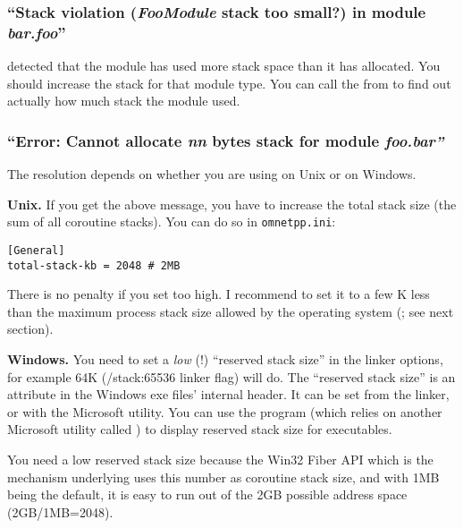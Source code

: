 \subsubsection{``Stack violation (\textit{FooModule} stack too small?) in module \textit{bar.foo}''}

{\opp} detected that the module has used more stack space than it has
allocated. You should increase the stack for that module type. You can call
the  from  to find out actually
how much stack the module used.


\subsubsection{``Error: Cannot allocate \textit{nn} bytes stack for module \textit{foo.bar''}}

The resolution depends on whether you are using {\opp} on Unix or on Windows.

\textbf{Unix.}
If you get the above message, you have to increase the total stack
size (the sum of all coroutine stacks). You can do
so in \texttt{omnetpp.ini}:

\begin{verbatim}
[General]
total-stack-kb = 2048 # 2MB
\end{verbatim}

There is no penalty if you set  too high. I
recommend to set it to a few K less than the maximum process stack
size allowed by the operating system (; see
next section).


\textbf{Windows.}
You need to set a \textit{low} (!) ``reserved stack size''
in the linker options, for example 64K (/stack:65536 linker flag) will do.
The ``reserved stack size'' is an attribute in the Windows exe
files' internal header. It can be set from the linker, or with
the  Microsoft utility. You can use the 
program (which relies on another Microsoft utility called )
to display reserved stack size for executables.

You need a low reserved stack size because the Win32 Fiber API
which is the mechanism underlying  uses
this number as coroutine stack size, and with 1MB being the default,
it is easy to run out of the 2GB possible address space (2GB/1MB=2048).

